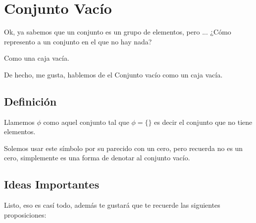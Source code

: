 \documentclass[12pt, fleqn]{report}                             %
\begin{document}
        \clearpage
        \section{Conjunto Vacío}
                
            Ok, ya sabemos que un conjunto es un grupo de elementos, pero ...
            ¿Cómo represento a un conjunto en el que no hay nada?

            Como una caja vacía.

            De hecho, me gusta, hablemos de el Conjunto vacío como un caja vacía.

            \subsection*{Definición}

                Llamemos $\phi$ como aquel conjunto tal que $\phi = \{ \}$ es decir el conjunto que no
                tiene elementos.

                Solemos usar este símbolo por su parecido con un cero, pero recuerda no es un cero,
                simplemente
                es una forma de denotar al conjunto vacío.


            \subsection{Ideas Importantes}

                Listo, eso es casí todo, además te gustará que te recuerde las siguientes
                proposiciones:
\end{document}
